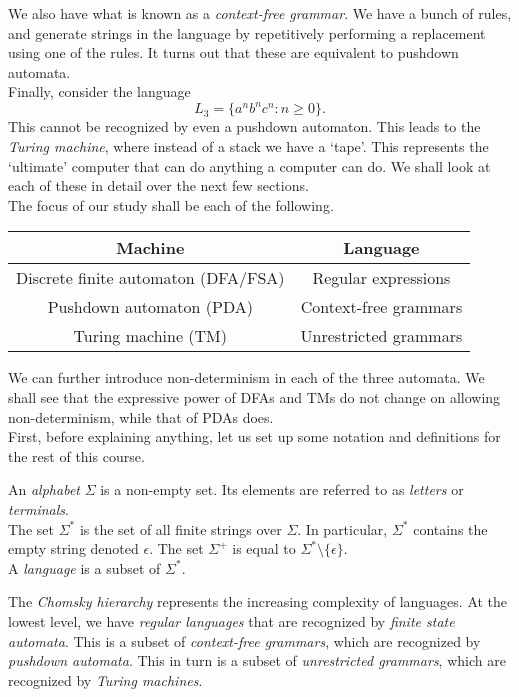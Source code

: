 We also have what is known as a \emph{context-free grammar}. We have a bunch of rules, and generate strings in the language by repetitively performing a replacement using one of the rules. It turns out that these are equivalent to pushdown automata.\\

Finally, consider the language
\[ L_3 = \{a^nb^nc^n : n \ge 0\}. \]
This cannot be recognized by even a pushdown automaton. This leads to the \emph{Turing machine}, where instead of a stack we have a `tape'. This represents the `ultimate' computer that can do anything a computer can do. We shall look at each of these in detail over the next few sections.\\

The focus of our study shall be each of the following.

\begin{center}
\begin{tabular}{|c|c|}
	\hline Machine & Language \\
	\hline
	Discrete finite automaton (DFA/FSA) & Regular expressions \\
	Pushdown automaton (PDA) & Context-free grammars \\
	Turing machine (TM) & Unrestricted grammars \\
	\hline
\end{tabular}
\end{center}

We can further introduce non-determinism in each of the three automata. We shall see that the expressive power of DFAs and TMs do not change on allowing non-determinism, while that of PDAs does.\\

First, before explaining anything, let us set up some notation and definitions for the rest of this course.

\begin{fdef}
	An \emph{alphabet} $\Sigma$ is a non-empty set. Its elements are referred to as \emph{letters} or \emph{terminals}.\\
	The set $\Sigma^*$ is the set of all finite strings over $\Sigma$. In particular, $\Sigma^*$ contains the empty string denoted $\epsilon$. The set $\Sigma^+$ is equal to $\Sigma^* \setminus \{\epsilon\}$.\\
	A \emph{language} is a subset of $\Sigma^*$.
\end{fdef}

The \emph{Chomsky hierarchy} represents the increasing complexity of languages. At the lowest level, we have \emph{regular languages} that are recognized by \emph{finite state automata}. This is a subset of \emph{context-free grammars}, which are recognized by \emph{pushdown automata}. This in turn is a subset of \emph{unrestricted grammars}, which are recognized by \emph{Turing machines}.\\

